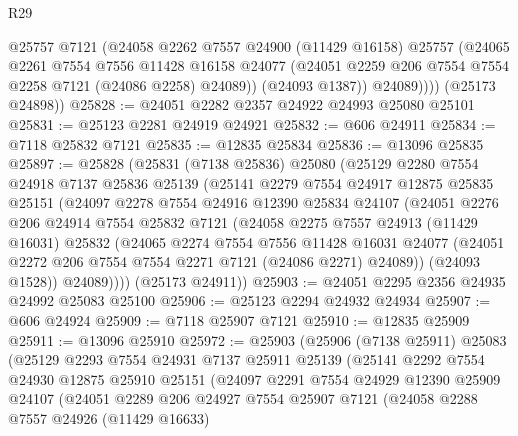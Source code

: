 \begin{lexlean}{R29}
\begin{coremodule}
              @25757
              @7121
              (@24058
                @2262
                @7557
                @24900
                (@11429 @16158)
                @25757
                (@24065
                  @2261
                  @7554
                  @7556
                  @11428
                  @16158
                  @24077
                  (@24051 @2259 @206 @7554 @7554 @2258 @7121 (@24086 @2258) @24089))
                (@24093 @1387))
              @24089))))
      (@25173 @24898))
@25828 := @24051 @2282 @2357 @24922 @24993 @25080 @25101
@25831 := @25123 @2281 @24919 @24921
@25832 := @606 @24911
@25834 := @7118 @25832 @7121
@25835 := @12835 @25834
@25836 := @13096 @25835
@25897 := @25828
    (@25831
      (@7138 @25836)
      @25080
      (@25129
        @2280
        @7554
        @24918
        @7137
        @25836
        @25139
        (@25141
          @2279
          @7554
          @24917
          @12875
          @25835
          @25151
          (@24097
            @2278
            @7554
            @24916
            @12390
            @25834
            @24107
            (@24051
              @2276
              @206
              @24914
              @7554
              @25832
              @7121
              (@24058
                @2275
                @7557
                @24913
                (@11429 @16031)
                @25832
                (@24065
                  @2274
                  @7554
                  @7556
                  @11428
                  @16031
                  @24077
                  (@24051 @2272 @206 @7554 @7554 @2271 @7121 (@24086 @2271) @24089))
                (@24093 @1528))
              @24089))))
      (@25173 @24911))
@25903 := @24051 @2295 @2356 @24935 @24992 @25083 @25100
@25906 := @25123 @2294 @24932 @24934
@25907 := @606 @24924
@25909 := @7118 @25907 @7121
@25910 := @12835 @25909
@25911 := @13096 @25910
@25972 := @25903
    (@25906
      (@7138 @25911)
      @25083
      (@25129
        @2293
        @7554
        @24931
        @7137
        @25911
        @25139
        (@25141
          @2292
          @7554
          @24930
          @12875
          @25910
          @25151
          (@24097
            @2291
            @7554
            @24929
            @12390
            @25909
            @24107
            (@24051
              @2289
              @206
              @24927
              @7554
              @25907
              @7121
              (@24058
                @2288
                @7557
                @24926
                (@11429 @16633)

\end{coremodule}
\end{lexlean}
